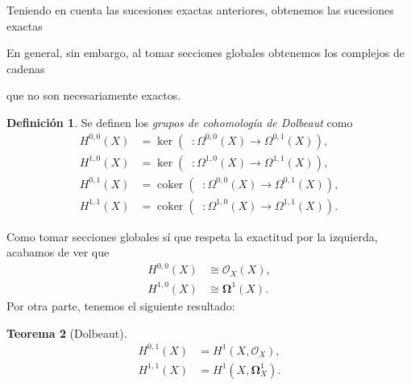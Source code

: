 \documentclass[autocontact]{gaceta}
\newtheorem{thm}{Teorema}[section]
\theoremstyle{definition} \newtheorem{defn}[thm]{Definición}
\theoremstyle{definition} \newtheorem{ejemplo}[thm]{Ejemplo}
\theoremstyle{definition} \newtheorem{ejercicio}[thm]{Ejercicio}
\def\OO{\mathscr{O}}
\DeclareMathOperator{\delbar}{\bar{\partial}}
\DeclareMathOperator{\coker}{coker}
\begin{document}
  Teniendo en cuenta las sucesiones exactas anteriores, obtenemos las sucesiones exactas
 \begin{center}      \end{center}
En general, sin embargo, al tomar secciones globales obtenemos los complejos de cadenas
 \begin{center}      \end{center}
que no son necesariamente exactos. 

\begin{defn}
  Se definen los \emph{grupos de cohomología de Dolbeaut} como
  \begin{align*}
    H^{0,0}(X)&=\ker(\delbar:\Omega^{0,0}(X) \rightarrow \Omega^{0,1}(X)), \\
    H^{1,0}(X)&=\ker(\delbar:\Omega^{1,0}(X) \rightarrow \Omega^{1,1}(X)), \\
    H^{0,1}(X)&=\coker(\delbar:\Omega^{0,0}(X) \rightarrow \Omega^{0,1}(X)), \\
    H^{1,1}(X)&=\coker(\delbar:\Omega^{1,0}(X) \rightarrow \Omega^{1,1}(X)) .
  \end{align*}
\end{defn}

Como tomar secciones globales sí que respeta la exactitud por la izquierda, acabamos de ver que
\begin{align*}
  H^{0,0}(X) & \cong \OO_X(X), \\
  H^{1,0}(X) & \cong \boldsymbol{\Omega}^1 (X).
\end{align*}
Por otra parte, tenemos el siguiente resultado:

\begin{thm}[Dolbeaut]
  \begin{align*}
    H^{0,1}(X) &= H^1(X,\OO_X), \\
    H^{1,1}(X) &= H^1(X,\boldsymbol{\Omega}^1_X).
  \end{align*}
\end{thm}
\end{document}
